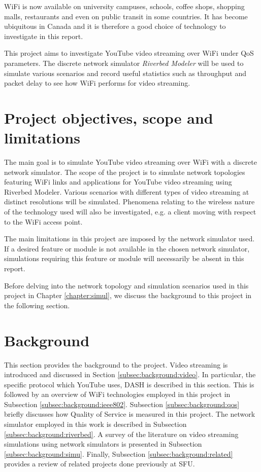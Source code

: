 \gls{WiFi} is now available on university campuses, schools, coffee shops, shopping malls, restaurants and even on public transit in some countries. It has become ubiquitous in Canada and it is therefore a good choice of technology to investigate in this report.
 
This project aims to investigate YouTube video streaming over \gls{WiFi} under \gls{QoS} parameters. The discrete network simulator \textit{Riverbed Modeler} will be used to simulate various scenarios and record useful statistics such as throughput and packet delay to see how \gls{WiFi} performs for video streaming.
 
\section{Project objectives, scope and limitations} \label{sec:intro:goals}
The main goal is to simulate YouTube video streaming over \gls{WiFi} with a discrete network simulator. The scope of the project is to simulate network topologies featuring \gls{WiFi} links and applications for YouTube video streaming using Riverbed Modeler. Various scenarios with different types of video streaming at distinct resolutions will be simulated. Phenomena relating to the wireless nature of the technology used will also be investigated, e.g. a client moving with respect to the \gls{WiFi} access point.

The main limitations in this project are imposed by the network simulator used. If a desired feature or module is not available in the chosen network simulator, simulations requiring this feature or module will necessarily be absent in this report.

Before delving into the network topology and simulation scenarios used in this project in Chapter \ref{chapter:simul}, we discuss the background to this project in the following section.

\section{Background} \label{sec:intro:background}
This section provides the background to the project. Video streaming is introduced and discussed in Section \ref{subsec:background:video}. In particular, the specific protocol which YouTube uses, \gls{DASH} is described in this section. This is followed by an overview of \gls{WiFi} technologies employed in this project in Subsection \ref{subsec:background:ieee802}. Subsection \ref{subsec:background:qos} briefly discusses how Quality of Service is measured in this project. The network simulator employed in this work is described in Subsection \ref{subsec:background:riverbed}. A survey of the literature on video streaming simulations using network simulators is presented in Subsection \ref{subsec:background:simu}.  Finally, Subsection \ref{subsec:background:related} provides a review of related projects done previously at SFU.

